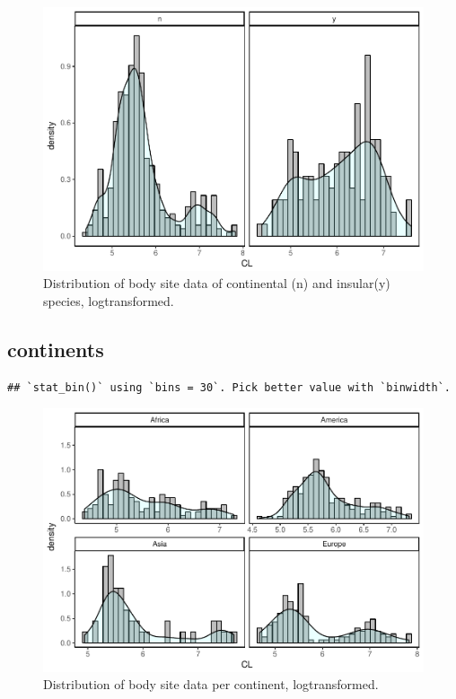 \documentclass[]{article}
\begin{document}
\begin{figure}[htbp]
\centering
\includegraphics{MA_JJ_files/figure-latex/Histograms of body size data, continental vs. insular-1.pdf}
\caption{Distribution of body site data of continental (n) and
insular(y) species, logtransformed.}
\end{figure}

\newpage

\subsection{continents}\label{continents}

\begin{verbatim}
## `stat_bin()` using `bins = 30`. Pick better value with `binwidth`.
\end{verbatim}

\begin{figure}[htbp]
\centering
\includegraphics{MA_JJ_files/figure-latex/Histograms of body size data, split by continents-1.pdf}
\caption{Distribution of body site data per continent, logtransformed.}
\end{figure}
\end{document}
